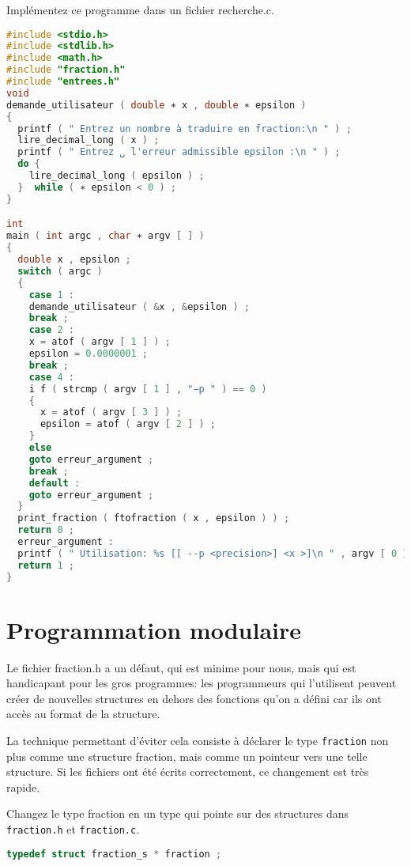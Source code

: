 Implémentez ce programme dans un fichier recherche.c.
\begin{solution}
  \begin{lstlisting}[language=C]
#include <stdio.h>
#include <stdlib.h>
#include <math.h>
#include "fraction.h"
#include "entrees.h"
void
demande_utilisateur ( double ∗ x , double ∗ epsilon )
{
  printf ( " Entrez un nombre à traduire en fraction:\n " ) ;
  lire_decimal_long ( x ) ;
  printf ( " Entrez ␣ l'erreur admissible epsilon :\n " ) ;
  do {
    lire_decimal_long ( epsilon ) ;
  }  while ( ∗ epsilon < 0 ) ;
}

int
main ( int argc , char ∗ argv [ ] )
{
  double x , epsilon ;
  switch ( argc )
  {
    case 1 :
    demande_utilisateur ( &x , &epsilon ) ;
    break ;
    case 2 :
    x = atof ( argv [ 1 ] ) ;
    epsilon = 0.0000001 ;
    break ;
    case 4 :
    i f ( strcmp ( argv [ 1 ] , "−p " ) == 0 )
    {
      x = atof ( argv [ 3 ] ) ;
      epsilon = atof ( argv [ 2 ] ) ;
    }
    else
    goto erreur_argument ;
    break ;
    default :
    goto erreur_argument ;
  }
  print_fraction ( ftofraction ( x , epsilon ) ) ;
  return 0 ;
  erreur_argument :
  printf ( " Utilisation: %s [[ --p <precision>] <x >]\n " , argv [ 0 ] ) ;
  return 1 ;
}

\end{lstlisting}
\end{solution}

\section{Programmation modulaire}

Le fichier fraction.h a un défaut, qui est minime pour nous, mais qui
est handicapant pour les gros programmes: les programmeurs qui
l’utilisent peuvent créer de nouvelles structures en dehors des
fonctions qu’on a défini car ils ont accès au format de la structure.

La technique permettant d’éviter cela consiste à déclarer le type
\texttt{fraction} non plus comme une structure fraction, mais comme un pointeur
vers une telle structure. Si les fichiers ont été écrits correctement,
ce changement est très rapide.


\question Changez le type fraction en un type qui pointe sur des structures dans \texttt{fraction.h}
et \texttt{fraction.c}.

\begin{solution}
  \begin{lstlisting}[language=C]
typedef struct fraction_s * fraction ;
  \end{lstlisting}
\end{solution}

